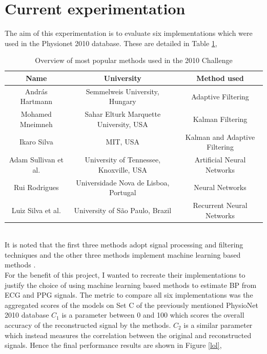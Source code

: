 \documentclass[11pt, a4paper]{article}
\begin{document}
\section{Current experimentation}
The aim of this experimentation is to evaluate six implementations which were used in the Physionet 2010 database. These are detailed in Table \ref{tab_experimentation}, \begin{table}[H]
    \centering
\begin{tabular}{|c|c|c|}
\hline
\textbf{Name} & \textbf{University} & \textbf{Method used} \\ \hline
András Hartmann & Semmelweis University, Hungary & Adaptive Filtering \\
Mohamed Mneimneh & Sahar Elturk Marquette University, USA & Kalman Filtering \\
Ikaro Silva & MIT, USA & Kalman and Adaptive Filtering \\
Adam Sullivan et al. & University of Tennessee, Knoxville, USA & Artificial Neural Networks \\
Rui Rodrigues & Universidade Nova de Lisboa, Portugal & Neural Networks \\
Luiz Silva et al. & University of São Paulo, Brazil & Recurrent Neural Networks \\
 \hline
\end{tabular}
\caption{Overview of most popular methods used in the 2010 Challenge \cite{challenge2010}}
\label{tab_experimentation}
\end{table} \\ \newline \noindent It is noted that the first three methods adopt signal processing and filtering techniques \cite{hartmann} \cite{mneimneh} \cite{iSilva} and the other three methods implement machine learning based methods \cite{lSilva}  \cite{rodrigues} \cite{sullivan}. \\ \newline \noindent For the benefit of this project, I wanted to recreate their implementations to justify the choice of using machine learning based methods to estimate BP from ECG and PPG signals. The metric to compare all six implementations was the aggregated scores of the models on Set C of the previously mentioned PhysioNet 2010 database \cite{challenge2010} $C_1$ is a parameter between 0 and 100 which scores the overall accuracy of the reconstructed signal by the methods. $C_2$ is a similar parameter which instead measures the correlation between the original and reconstructed signals. Hence the final performance results are shown in Figure \ref{lol}, \begin{figure}[H]

\end{figure}
\end{document}
